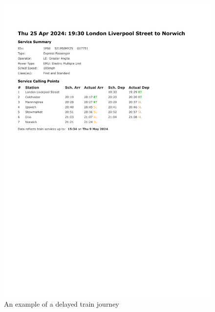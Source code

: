 
\begin{figure}[!htbp]
    \includegraphics[trim=0 480 0 0]{Diagrams/Exmple of train times/Late/Service Information_25-04-24.pdf}
    \caption[short]{An example of a delayed train journey}
    \label{fig: real delayed train times}
\end{figure}


